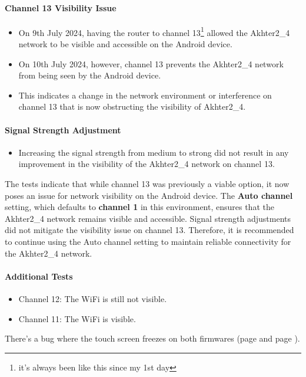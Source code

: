   \paragraph{Channel 13 Visibility Issue}
  \begin{itemize}
    \item On 9th July 2024, having the router to channel 13\footnote{it's always been like this since my 1st day} allowed the Akhter2\_4 network to be visible and accessible on the Android device.
    \item On 10th July 2024, however, channel 13 prevents the Akhter2\_4 network from being seen by the Android device.
    \item This indicates a change in the network environment or interference on channel 13 that is now obstructing the visibility of Akhter2\_4.
  \end{itemize}

  \paragraph{Signal Strength Adjustment}
  \begin{itemize}
    \item Increasing the signal strength from medium to strong did not result in any improvement in the visibility of the Akhter2\_4 network on channel 13.
  \end{itemize}

  The tests indicate that while channel 13 was previously a viable option, it now poses an issue for network visibility on the Android device. The \textbf{Auto channel} setting, which defaults to \textbf{channel 1} in this environment, ensures that the Akhter2\_4 network remains visible and accessible. Signal strength adjustments did not mitigate the visibility issue on channel 13. Therefore, it is recommended to continue using the Auto channel setting to maintain reliable connectivity for the Akhter2\_4 network.

  \paragraph{Additional Tests}
  \begin{itemize}
    \item Channel 12: The WiFi is still not visible.
    \item Channel 11: The WiFi is visible.
  \end{itemize}

  There's a bug where the touch screen freezes on both firmwares (page \pageref{sec:firmware20240611225217} and page \pageref{sec:firmware20240705151015}).

